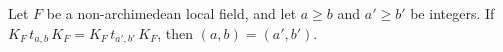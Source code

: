Let $F$ be a non-archimedean local field, and let $a\ge b$ and $a'\ge b'$ be integers. If
$K_F\,t_{a,b}\,K_F=K_F\,t_{a',b'}\,K_F$, then $(a,b)=(a',b')$.
